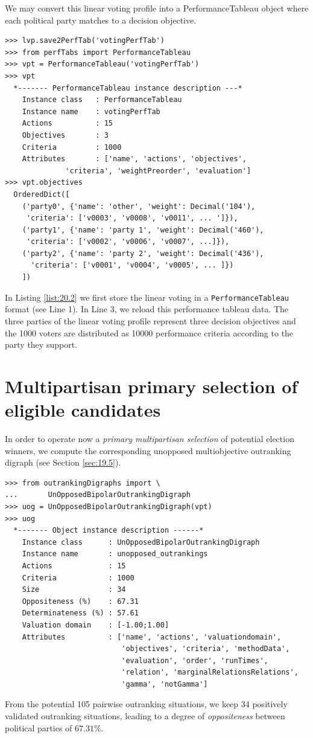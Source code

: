 We may convert this linear voting profile into a PerformanceTableau object where each political party matches to a decision objective.
\begin{lstlisting}[caption={Converting a voting profile into a performance tableau},label=list:20.2]
>>> lvp.save2PerfTab('votingPerfTab')
>>> from perfTabs import PerformanceTableau
>>> vpt = PerformanceTableau('votingPerfTab')
>>> vpt
  *------- PerformanceTableau instance description ---*
    Instance class   : PerformanceTableau
    Instance name    : votingPerfTab
    Actions          : 15
    Objectives       : 3
    Criteria         : 1000
    Attributes       : ['name', 'actions', 'objectives',
              'criteria', 'weightPreorder', 'evaluation']
>>> vpt.objectives
  OrderedDict([
    ('party0', {'name': 'other', 'weight': Decimal('104'),
     'criteria': ['v0003', 'v0008', 'v0011', ... ']}),
    ('party1', {'name': 'party 1', 'weight': Decimal('460'),
     'criteria': ['v0002', 'v0006', 'v0007', ...]}),
    ('party2', {'name': 'party 2', 'weight': Decimal('436'),
      'criteria': ['v0001', 'v0004', 'v0005', ... ]})
    ])
\end{lstlisting}
In Listing \ref{list:20.2} we first store the linear voting in a \texttt{PerformanceTableau} format (see Line 1). In Line 3, we reload this performance tableau data. The three parties of the linear voting profile represent three decision objectives and the 1000 voters are distributed as 10000 performance criteria according to the party they support.

\section{Multipartisan primary selection of eligible candidates}
\label{sec:20.2}

In order to operate now a \emph{primary multipartisan selection} of potential election winners, we compute the corresponding unopposed multiobjective outranking digraph (see Section \ref{sec:19.5}).
\begin{lstlisting}[caption={Computing unopposed multiobjective outranking situations},label=list:20.3]
>>> from outrankingDigraphs import \
...       UnOpposedBipolarOutrankingDigraph
>>> uog = UnOpposedBipolarOutrankingDigraph(vpt)
>>> uog
  *------- Object instance description ------*
    Instance class      : UnOpposedBipolarOutrankingDigraph
    Instance name       : unopposed_outrankings
    Actions             : 15
    Criteria            : 1000
    Size                : 34
    Oppositeness (%)    : 67.31
    Determinateness (%) : 57.61
    Valuation domain    : [-1.00;1.00]
    Attributes          : ['name', 'actions', 'valuationdomain',
                           'objectives', 'criteria', 'methodData',
                           'evaluation', 'order', 'runTimes',
                           'relation', 'marginalRelationsRelations',
                           'gamma', 'notGamma']
\end{lstlisting}
From the potential 105 pairwise outranking situations, we keep 34 positively validated outranking situations, leading to a degree of \emph{oppositeness} between political parties of $67.31\%$.

